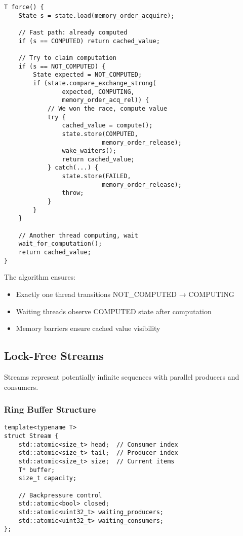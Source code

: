 \documentclass[sigconf,review,anonymous]{acmart}
\begin{document}
\begin{lstlisting}
T force() {
    State s = state.load(memory_order_acquire);
    
    // Fast path: already computed
    if (s == COMPUTED) return cached_value;
    
    // Try to claim computation
    if (s == NOT_COMPUTED) {
        State expected = NOT_COMPUTED;
        if (state.compare_exchange_strong(
                expected, COMPUTING,
                memory_order_acq_rel)) {
            // We won the race, compute value
            try {
                cached_value = compute();
                state.store(COMPUTED, 
                           memory_order_release);
                wake_waiters();
                return cached_value;
            } catch(...) {
                state.store(FAILED,
                           memory_order_release);
                throw;
            }
        }
    }
    
    // Another thread computing, wait
    wait_for_computation();
    return cached_value;
}
\end{lstlisting}

The algorithm ensures:
\begin{itemize}
\item Exactly one thread transitions NOT\_COMPUTED → COMPUTING
\item Waiting threads observe COMPUTED state after computation
\item Memory barriers ensure cached value visibility
\end{itemize}

\subsection{Lock-Free Streams}

Streams represent potentially infinite sequences with parallel producers and consumers.

\subsubsection{Ring Buffer Structure}

\begin{lstlisting}
template<typename T>
struct Stream {
    std::atomic<size_t> head;  // Consumer index
    std::atomic<size_t> tail;  // Producer index  
    std::atomic<size_t> size;  // Current items
    T* buffer;
    size_t capacity;
    
    // Backpressure control
    std::atomic<bool> closed;
    std::atomic<uint32_t> waiting_producers;
    std::atomic<uint32_t> waiting_consumers;
};
\end{lstlisting}
\end{document}
